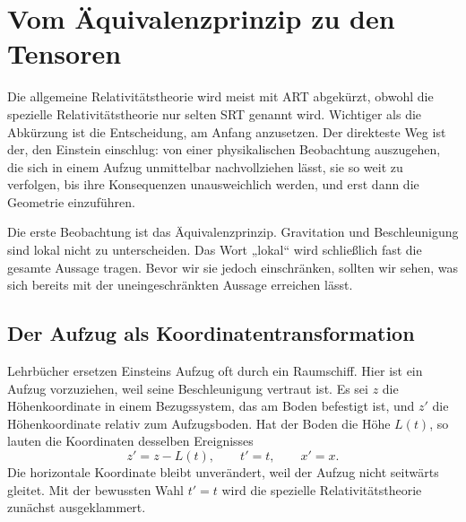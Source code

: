\chapter{Vom Äquivalenzprinzip zu den Tensoren}

Die allgemeine Relativitätstheorie wird meist mit ART abgekürzt, obwohl die spezielle Relativitätstheorie nur selten SRT genannt wird. Wichtiger als die Abkürzung ist die Entscheidung, am Anfang anzusetzen. Der direkteste Weg ist der, den Einstein einschlug: von einer physikalischen Beobachtung auszugehen, die sich in einem Aufzug unmittelbar nachvollziehen lässt, sie so weit zu verfolgen, bis ihre Konsequenzen unausweichlich werden, und erst dann die Geometrie einzuführen.

Die erste Beobachtung ist das Äquivalenzprinzip. Gravitation und Beschleunigung sind lokal nicht zu unterscheiden. Das Wort „lokal“ wird schließlich fast die gesamte Aussage tragen. Bevor wir sie jedoch einschränken, sollten wir sehen, was sich bereits mit der uneingeschränkten Aussage erreichen lässt.

\section{Der Aufzug als Koordinatentransformation}

Lehrbücher ersetzen Einsteins Aufzug oft durch ein Raumschiff. Hier ist ein Aufzug vorzuziehen, weil seine Beschleunigung vertraut ist. Es sei \(z\) die Höhenkoordinate in einem Bezugssystem, das am Boden befestigt ist, und \(z'\) die Höhenkoordinate relativ zum Aufzugsboden. Hat der Boden die Höhe \(L(t)\), so lauten die Koordinaten desselben Ereignisses
\begin{equation}
 z'=z-L(t),\qquad t'=t,\qquad x'=x.
\label{eq:elevator-map}
\end{equation}
Die horizontale Koordinate bleibt unverändert, weil der Aufzug nicht seitwärts gleitet. Mit der bewussten Wahl \(t'=t\) wird die spezielle Relativitätstheorie zunächst ausgeklammert.

\begin{classroomqa}
\end{classroomqa}

